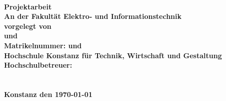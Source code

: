 \begin{titlepage}
\vspace*{-3cm}
    \begin{figure}[ht]
        \hspace{7cm}
    \end{figure}
        
	\begin{center}
		\vspace*{1cm}
		\LARGE\bf\myTopic\\
		\vspace*{1cm}
		\normalsize\rm
		\vspace*{1cm}
		\textbf{Projektarbeit}\\
		\vspace*{0.5cm}
		An der Fakultät Elektro- und Informationstechnik \\
		\vspace*{0.5cm}
		vorgelegt von  \\
	    \vspace*{0.25cm}
		\textbf{\myAutorTwo\:und \myAutor}  \\
		\vspace*{0.25cm}
		Matrikelnummer: \myMatrikelnummerTwo\:und \myMatrikelnummer \\
		\vspace*{1cm}
		Hochschule Konstanz für Technik, Wirtschaft und Gestaltung \\
		\vspace*{1cm}
		Hochschulbetreuer: \\
		\textbf{\mySupervisorTwo}\\
		\textbf{\mySupervisor}\\
		\vspace*{1cm}
		\textbf{Konstanz den \today}
	\end{center}
\end{titlepage}
\newpage
\setcounter{page}{2}

